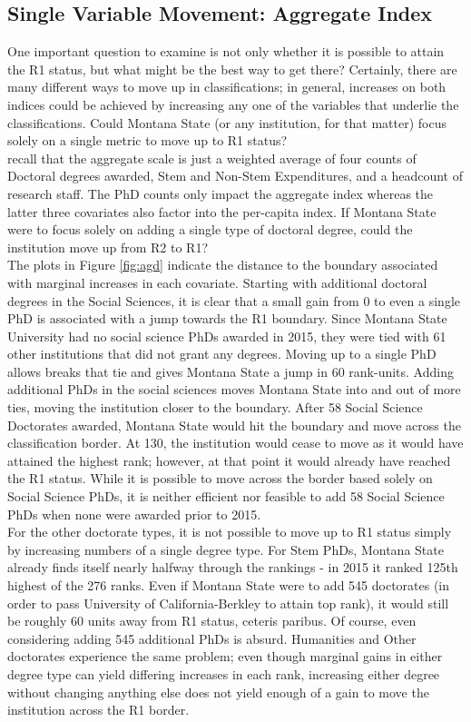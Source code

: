 \documentclass{article}
\begin{document}
  \subsection{Single Variable Movement: Aggregate Index}
  One important question to examine is not only whether it is possible to attain the R1 status, but what might be the best way to get there? Certainly, there are many different ways to move up in classifications; in general, increases on both indices could be achieved by increasing any one of the variables that underlie the classifications. Could Montana State (or any institution, for that matter) focus solely on a single metric to move up to R1 status?\\
  recall that the aggregate scale is just a weighted average of four counts of Doctoral degrees awarded, Stem and Non-Stem Expenditures, and a headcount of research staff. The PhD counts only impact the aggregate index whereas the latter three covariates also factor into the per-capita index. If Montana State were to focus solely on adding a single type of doctoral degree, could the institution move up from R2 to R1?\\
  The plots in Figure \ref{fig:agd} indicate the distance to the boundary associated with marginal increases in each covariate. Starting with additional doctoral degrees in the Social Sciences, it is clear that a small gain from 0 to even a single PhD is associated with a jump towards the R1 boundary. Since Montana State University had no social science PhDs awarded in 2015, they were tied with 61 other institutions that did not grant any degrees. Moving up to a single PhD allows breaks that tie and gives Montana State a jump in 60 rank-units. Adding additional PhDs in the social sciences moves Montana State into and out of more ties, moving the institution closer to the boundary. After 58 Social Science Doctorates awarded, Montana State would hit the boundary and move across the classification border.  At 130, the institution would cease to move as it would have attained the highest rank; however, at that point it would already have reached the R1 status. While it is possible to move across the border based solely on Social Science PhDs, it is neither efficient nor feasible to add 58 Social Science PhDs when none were awarded prior to 2015. \\
  For the other doctorate types, it is not possible to move up to R1 status simply by increasing numbers of a single degree type. For Stem PhDs, Montana State already finds itself nearly halfway through the rankings - in 2015 it ranked 125th highest of the 276 ranks. Even if Montana State were to add 545 doctorates (in order to pass University of California-Berkley to attain top rank), it would still be roughly 60 units away from R1 status, ceteris paribus. Of course, even considering adding 545 additional PhDs is absurd. Humanities and Other doctorates experience the same problem; even though marginal gains in either degree type can yield differing increases in each rank, increasing either degree without changing anything else does not yield enough of a gain to move the institution across the R1 border. \\ 
\end{document}
